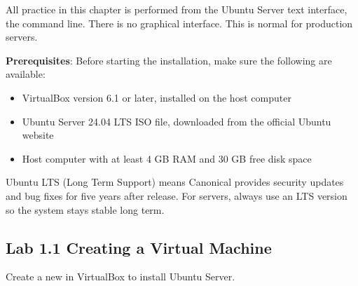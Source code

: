 \begin{notebox}
All practice in this chapter is performed from the Ubuntu Server text interface, the command line. There is no graphical interface. This is normal for production servers.
\end{notebox}

\textbf{Prerequisites}: Before starting the installation, make sure the following are available:

\begin{itemize}
    \item VirtualBox version 6.1 or later, installed on the host computer
    \item Ubuntu Server 24.04 LTS ISO file, downloaded from the official Ubuntu website
    \item Host computer with at least 4 GB RAM and 30 GB free disk space
\end{itemize}

\begin{tipbox}
Ubuntu LTS (Long Term Support) means Canonical provides security updates and bug fixes for five years after release. For servers, always use an LTS version so the system stays stable long term.
\end{tipbox}

\subsection*{Lab 1.1 Creating a Virtual Machine}

Create a new  in VirtualBox to install Ubuntu Server.

